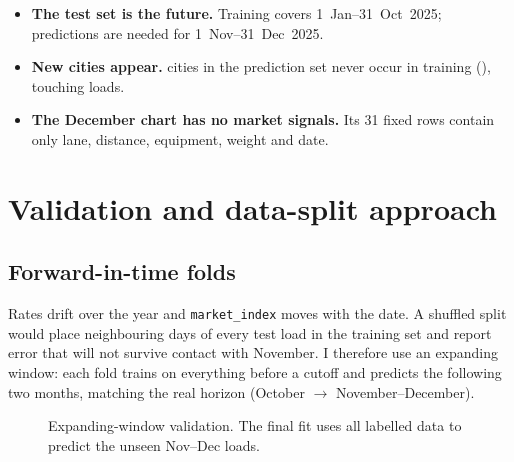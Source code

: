 \documentclass[10pt,a4paper]{article}
\newcommand{\sans}{\fontfamily{phv}\selectfont}
\begin{document}
\begin{itemize}
  \item \textbf{The test set is the future.} Training covers 1~Jan--31~Oct~2025; predictions are needed for 1~Nov--31~Dec~2025.
  \item \textbf{New cities appear.} \xNUnseen{} cities in the prediction set never occur in training
        (\xUnseenList), touching \xUnseenRows{} loads.
  \item \textbf{The December chart has no market signals.} Its 31 fixed rows contain only lane, distance, equipment, weight and date.
\end{itemize}

\section{Validation and data-split approach}
\subsection{Forward-in-time folds}
Rates drift over the year and \texttt{market\_index} moves with the date. A shuffled split would place
neighbouring days of every test load in the training set and report error that will not survive contact with November.
I therefore use an expanding window: each fold trains on everything before a cutoff and predicts the following two months,
matching the real horizon (October $\rightarrow$ November--December).

\begin{figure}[H]
\centering
{}
\caption{Expanding-window validation. The final fit uses all labelled data to predict the unseen Nov--Dec loads.}
\end{figure}
\end{document}
